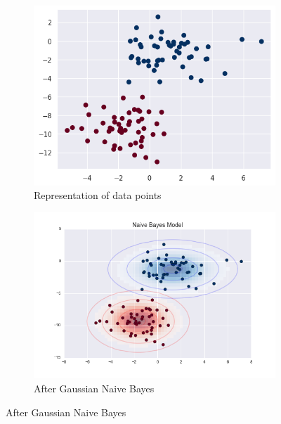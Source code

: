 \documentclass[12pt]{article}
\begin{document}
\begin{figure}[h]
    \begin{subfigure}{0.5\textwidth}
    \includegraphics[width=\linewidth]{gaus-nb-before.png} 
    \caption{Representation of data points}
    \label{fig:subim1}
    \end{subfigure}
    \begin{subfigure}{0.5\textwidth}
    \includegraphics[width=\linewidth]{gaus-nb-after-2.png}
    \caption{After Gaussian Naive Bayes}
    \label{fig:subim2}
    \end{subfigure}
\end{figure}
\newpage
\end{document}
